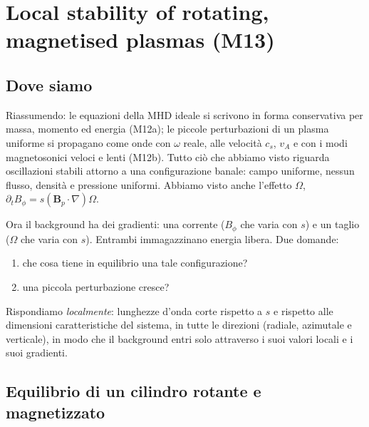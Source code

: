 \section{Local stability of rotating, magnetised plasmas (M13)}

\subsection{Dove siamo}

Riassumendo: le equazioni della MHD ideale si scrivono in forma conservativa per massa, momento ed energia (M12a); le piccole perturbazioni di un plasma uniforme si propagano come onde con $\omega$ reale, alle velocità $c_s$, $v_A$ e con i modi magnetosonici veloci e lenti (M12b). Tutto ciò che abbiamo visto riguarda oscillazioni stabili attorno a una configurazione banale: campo uniforme, nessun flusso, densità e pressione uniformi. Abbiamo visto anche l'effetto $\Omega$, $\partial_tB_\phi=s(\mathbf{B}_p\cdot\nabla)\Omega$.

Ora il background ha dei gradienti: una corrente ($B_\phi$ che varia con $s$) e un taglio ($\Omega$ che varia con $s$). Entrambi immagazzinano energia libera. Due domande:
\begin{enumerate}
\item che cosa tiene in equilibrio una tale configurazione?
\item una piccola perturbazione cresce?
\end{enumerate}
Rispondiamo \emph{localmente}: lunghezze d'onda corte rispetto a $s$ e rispetto alle dimensioni caratteristiche del sistema, in tutte le direzioni (radiale, azimutale e verticale), in modo che il background entri solo attraverso i suoi valori locali e i suoi gradienti.

\subsection{Equilibrio di un cilindro rotante e magnetizzato}

